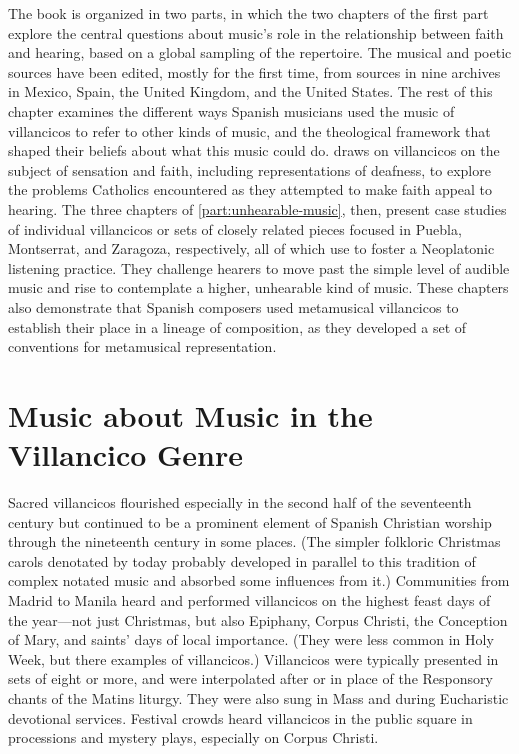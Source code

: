 The book is organized in two parts, in which the two chapters of the first part
explore the central questions about music's role in the relationship between
faith and hearing, based on a global sampling of the repertoire.
The musical and poetic sources have been edited, mostly for the first time,
from sources in nine archives in Mexico, Spain, the United Kingdom, and the
United States.
The rest of this chapter examines the different ways Spanish musicians used
the music of villancicos to refer to other kinds of music, and the theological
framework that shaped their beliefs about what this music could do.
 draws on villancicos on the subject of sensation and
faith, including representations of deafness, to explore the problems Catholics
encountered as they attempted to make faith appeal to hearing.
The three chapters of \cref{part:unhearable-music}, then, present case studies
of individual villancicos or sets of closely related pieces focused in Puebla,
Montserrat, and Zaragoza, respectively, all of which use  to foster a Neoplatonic listening practice.
They challenge hearers to move past the simple level of audible music and rise
to contemplate a higher, unhearable kind of music.
These chapters also demonstrate that Spanish composers used metamusical
villancicos to establish their place in a lineage of composition, as they
developed a set of conventions for metamusical representation.

\section{Music about Music in the Villancico Genre}

Sacred villancicos flourished especially in the second half of the seventeenth
century but continued to be a prominent element of Spanish Christian worship
through the nineteenth century in some places.
(The simpler folkloric Christmas carols denotated by  today
probably developed in parallel to this tradition of complex notated music and
absorbed some influences from it.)
Communities from Madrid to Manila heard and performed villancicos on the
highest feast days of the year---not just Christmas, but also Epiphany, Corpus
Christi, the Conception of Mary, and saints' days of local importance.
(They were less common in Holy Week, but there examples of 
villancicos.)
Villancicos were typically presented in sets of eight or more, and were
interpolated after or in place of the Responsory chants of the Matins liturgy.
They were also sung in Mass and during Eucharistic devotional services.
Festival crowds heard villancicos in the public square in processions and
mystery plays, especially on Corpus Christi.

